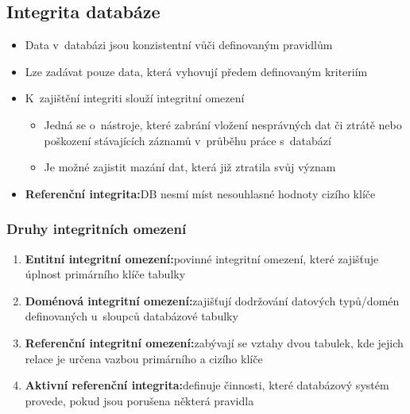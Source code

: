 \documentclass[a4paper,10pt]{article}
\newcommand{\pojem}[2]{\item \textbf{#1:}\quad #2}
\begin{document}
    \subsection{Integrita databáze}
      \begin{itemize}
        \item Data v~databázi jsou konzistentní vůči definovaným pravidlům
        \item Lze zadávat pouze data, která vyhovují předem definovaným kriteriím
        \item K~zajištění integriti slouží integritní omezení
        \begin{itemize}
          \item Jedná se o~nástroje, které zabrání vložení nesprávných dat či ztrátě nebo poškození stávajících záznamů v~průběhu práce s~databází
          \item Je možné zajistit mazání dat, která již ztratila svůj význam
        \end{itemize}
        \pojem{Referenční integrita}{DB nesmí míst nesouhlasné hodnoty cizího klíče}
      \end{itemize}

      \subsubsection{Druhy integritních omezení}
        \begin{enumerate}
          \pojem{Entitní integritní omezení}{povinné integritní omezení, které zajišťuje úplnost primárního klíče tabulky}
          \pojem{Doménová integritní omezení}{zajišťují dodržování datových typů/domén definovaných u~sloupců databázové tabulky}
          \pojem{Referenční integritní omezení}{zabývají se vztahy dvou tabulek, kde jejich relace je určena vazbou primárního a cizího klíče}
          \pojem{Aktivní referenční integrita}{definuje činnosti, které databázový systém provede, pokud jsou porušena některá pravidla}
        \end{enumerate}
\end{document}
